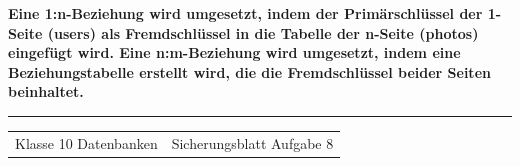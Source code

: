 \documentclass[10pt,a4paper]{article}
\makeatletter
\newcommand{\sheetfooter}{%
  \vfill{\color{Line}\rule{\linewidth}{.5pt}}\par\vspace{0.8mm}
  \begin{tabularx}{\linewidth}{@{}Xr@{}}{\small\color{Muted}Klasse 10 \textperiodcentered{} Datenbanken} & {\small\color{Muted}Sicherungsblatt \textperiodcentered{} Aufgabe 8}\end{tabularx}}
\makeatother
\begin{document}
\vspace{1mm}
\begin{tcolorbox}[colback=Mint,colframe=Blue,arc=1.5mm,boxrule=.7pt,left=2mm,right=2mm,top=1mm,bottom=1mm]
{\small\bfseries Eine 1:n-Beziehung wird umgesetzt, indem der Primärschlüssel der 1-Seite (users) als Fremdschlüssel in die Tabelle der n-Seite (photos) eingefügt wird. Eine n:m-Beziehung wird umgesetzt, indem eine Beziehungstabelle erstellt wird, die die Fremdschlüssel beider Seiten beinhaltet.}
\end{tcolorbox}

\sheetfooter
\end{document}
